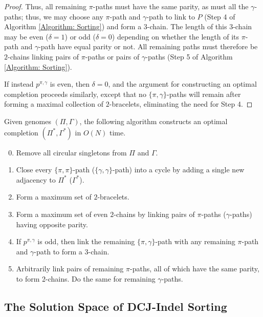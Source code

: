 \begin{proof}
Thus, all remaining $\pi$-paths must have the same parity, as must all the $\gamma$-paths; thus, we may choose any $\pi$-path and $\gamma$-path to link to $P$ (Step 4 of Algorithm \ref{Algorithm: Sorting}) and form a 3-chain.  The length of this 3-chain may be even ($\delta = 1$) or odd ($\delta = 0$) depending on whether the length of its $\pi$-path and $\gamma$-path have equal parity or not.  All remaining paths must therefore be $2$-chains linking pairs of $\pi$-paths or pairs of $\gamma$-paths (Step 5 of Algorithm \ref{Algorithm: Sorting}).

If instead $p^{\pi, \gamma}$ is even, then $\delta = 0$, and the argument for constructing an optimal completion proceeds similarly, except that no $\{\pi, \gamma\}$-paths will remain after forming a maximal collection of $2$-bracelets, eliminating the need for Step 4. 

\end{proof}

\begin{algorithm} Given genomes $(\Pi, \Gamma)$, the following algorithm constructs an optimal completion $(\Pi^*, \Gamma^*)$ in $O(N)$ time.
\begin{enumerate}
\setcounter{enumi}{-1}
\item Remove all circular singletons from $\Pi$ and $\Gamma$.
\item Close every $\{\pi, \pi\}$-path ($\{\gamma, \gamma\}$-path) into a cycle by adding a single new adjacency to $\Pi^*$ ($\Gamma^*$).
\item Form a maximum set of $2$-bracelets.
\item Form a maximum set of even $2$-chains by linking pairs of $\pi$-paths ($\gamma$-paths) having opposite parity.
\item If $p^{\pi, \gamma}$ is odd, then link the remaining $\{\pi, \gamma\}$-path with any remaining $\pi$-path and $\gamma$-path to form a 3-chain.
\item Arbitrarily link pairs of remaining $\pi$-paths, all of which have the same parity, to form 2-chains.  Do the same for remaining $\gamma$-paths.
\end{enumerate}
\label{Algorithm: Sorting}
\end{algorithm}

\subsection*{The Solution Space of DCJ-Indel Sorting} \label{Section: Solution Space}


